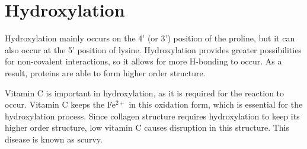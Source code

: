 \section{Hydroxylation}

Hydroxylation mainly occurs on the 4' (or 3') position of the proline, but it can also occur at the 5' position of lysine.
Hydroxylation provides greater possibilities for non-covalent interactions, so it allows for more H-bonding to occur.
As a result, proteins are able to form higher order structure.

Vitamin C is important in hydroxylation, as it is required for the reaction to occur.
Vitamin C keeps the Fe$^{2+}$ in this oxidation form, which is essential for the hydroxylation process.
Since collagen structure requires hydroxylation to keep its higher order structure, low vitamin C causes disruption in this structure.
This disease is known as scurvy.
